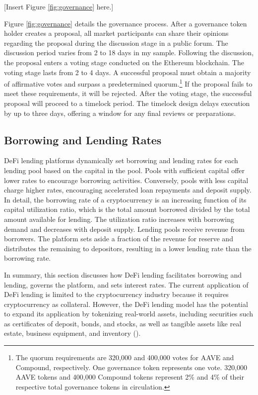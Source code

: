 \documentclass[12pt]{article}
\begin{document}
\centerline{[Insert Figure \ref{fig:governance} here.]}

 Figure \ref{fig:governance} details the governance process. After a governance token holder creates a proposal, all market participants can share their opinions regarding the proposal during the discussion stage in a public forum. The discussion period varies from 2 to 18 days in my sample. Following the discussion, the proposal enters a voting stage conducted on the Ethereum blockchain. The voting stage lasts from 2 to 4 days. A successful proposal must obtain a majority of affirmative votes and surpass a predetermined quorum.\footnote{The quorum requirements are 320,000 and 400,000 votes for AAVE and Compound, respectively. One governance token represents one vote. 320,000 AAVE tokens and 400,000 Compound tokens represent 2\% and 4\% of their respective total governance tokens in circulation.} If the proposal fails to meet these requirements, it will be rejected. After the voting stage, the successful proposal will proceed to a timelock period. The timelock design delays execution by up to three days, offering a window for any final reviews or preparations. 

\subsection{Borrowing and Lending Rates}

DeFi lending platforms dynamically set borrowing and lending rates for each lending pool based on the capital in the pool. Pools with sufficient capital offer lower rates to encourage borrowing activities. Conversely, pools with less capital charge higher rates, encouraging accelerated loan repayments and deposit supply. In detail, the borrowing rate of a cryptocurrency is an increasing function of its capital utilization ratio, which is the total amount borrowed divided by the total amount available for lending. The utilization ratio increases with borrowing demand and decreases with deposit supply. Lending pools receive revenue from borrowers. The platform sets aside a fraction of the revenue for reserve and distributes the remaining to depositors, resulting in a lower lending rate than the borrowing rate. 

In summary, this section discusses how DeFi lending facilitates borrowing and lending, governs the platform, and sets interest rates. The current application of DeFi lending is limited to the cryptocurrency industry because it requires cryptocurrency as collateral. However, the DeFi lending model has the potential to expand its application by tokenizing real-world assets, including securities such as certificates of deposit, bonds, and stocks, as well as tangible assets like real estate, business equipment, and inventory (\citealp{aramonte2022defi}).
\end{document}
